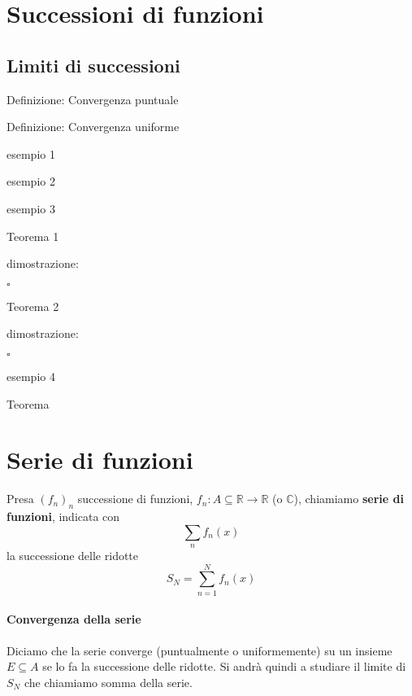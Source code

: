 \documentclass[x11names]{article}
\newcommand*{\QEDB}{\null\nobreak\hfill\ensuremath{\square}}%
\newcommand{\esempio}[2]{
	\begin{es}{esempio #1}
		#2
	\end{es}
}
\newcommand{\definizione}[2]{
	\begin{center}
		\fboxsep11pt
		\colorbox{myblue}{\begin{minipage}{5.75in}
				\begin{blues}{Definizione: #1}
					#2
				\end{blues}
		\end{minipage}}
	\end{center}
}
\newcommand{\teorema}[2]{
	\begin{center}
		\fboxsep11pt
		\colorbox{myred}{\begin{minipage}{5.75in}
				\begin{redes}{#1}
					#2
				\end{redes}
		\end{minipage}}
	\end{center}
}
\newcommand{\dimostrazione}[2]{
	\begin{dym}{dimostrazione: #1}
		#2
		\QEDB
	\end{dym}
}
\begin{document}
	

\tableofcontents
\newpage
	
	
\section{Successioni di funzioni}

\begin{center}
\end{center}

\subsection{Limiti di successioni}


\definizione{Convergenza puntuale}{}

\definizione{Convergenza uniforme}{}


\esempio{1}{}
\esempio{2}{}
\esempio{3}{}



\teorema{Teorema 1}{}
\dimostrazione{}{}

\teorema{Teorema 2}{}
\dimostrazione{}{}

\esempio{4}{}

\teorema{Teorema}{}


\section{Serie di funzioni}
Presa \((f_{n})_{n}\) successione di funzioni, \(f_{n}:A\subseteq \mathbb{R} \to \mathbb{R}\) (o \(\mathbb{C}\)), chiamiamo \textbf{serie di funzioni}, indicata con
\[ 
\sum_n f_{n}(x)
\]
la successione delle ridotte 
\[ 
S_{N} = \sum_{n=1}^N f_{n}(x)
\]
\paragraph{Convergenza della serie} Diciamo che la serie converge (puntualmente o uniformemente) su un insieme \(E\subseteq A\) se lo fa la successione delle ridotte. Si andrà quindi a studiare il limite di \(S_{N}\) che chiamiamo somma della serie.
\end{document}
